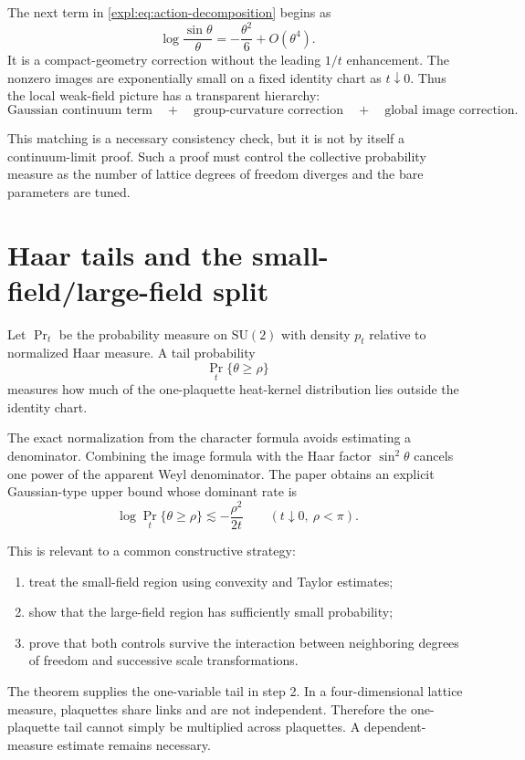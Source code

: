 \documentclass[11pt]{article}
\theoremstyle{definition}
\newcommand{\SU}{\mathrm{SU}(2)}
\begin{document}
The next term in \eqref{expl:eq:action-decomposition} begins as
\[
 \log\frac{\sin\theta}{\theta}
 =-\frac{\theta^2}{6}+O(\theta^4).
\]
It is a compact-geometry correction without the leading $1/t$ enhancement.
The nonzero images are exponentially small on a fixed identity chart as
$t\downarrow0$.  Thus the local weak-field picture has a transparent
hierarchy:
\[
 \text{Gaussian continuum term}
 \quad+\quad
 \text{group-curvature correction}
 \quad+\quad
 \text{global image correction}.
\]

This matching is a necessary consistency check, but it is not by itself a
continuum-limit proof.  Such a proof must control the collective probability
measure as the number of lattice degrees of freedom diverges and the bare
parameters are tuned.

\section{Haar tails and the small-field/large-field split}

Let $\Pr_t$ be the probability measure on $\SU$ with density $p_t$ relative
to normalized Haar measure.  A tail probability
\[
 \Pr_t\{\theta\ge\rho\}
\]
measures how much of the one-plaquette heat-kernel distribution lies outside
the identity chart.

The exact normalization from the character formula avoids estimating a
denominator.  Combining the image formula with the Haar factor
$\sin^2\theta$ cancels one power of the apparent Weyl denominator.  The paper
obtains an explicit Gaussian-type upper bound whose dominant rate is
\begin{equation}\label{expl:eq:tail-rate}
 \log\Pr_t\{\theta\ge\rho\}
 \lesssim-\frac{\rho^2}{2t}
 \qquad (t\downarrow0,\ \rho<\pi).
\end{equation}

This is relevant to a common constructive strategy:
\begin{enumerate}
\item treat the small-field region using convexity and Taylor estimates;
\item show that the large-field region has sufficiently small probability;
\item prove that both controls survive the interaction between neighboring
degrees of freedom and successive scale transformations.
\end{enumerate}

The theorem supplies the one-variable tail in step 2.  In a four-dimensional
lattice measure, plaquettes share links and are not independent.  Therefore
the one-plaquette tail cannot simply be multiplied across plaquettes.  A
dependent-measure estimate remains necessary.
\end{document}
